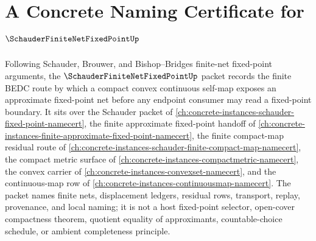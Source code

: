 \chapter{A Concrete Naming Certificate for $\SchauderFiniteNetFixedPointUp$}
\label{ch:concrete-instances-schauder-finite-net-fixed-point-namecert}

Following Schauder, Brouwer, and Bishop--Bridges finite-net fixed-point arguments, the $\SchauderFiniteNetFixedPointUp$ packet records the finite BEDC route by which a compact convex continuous self-map exposes an approximate fixed-point net before any endpoint consumer may read a fixed-point boundary. It sits over the Schauder packet of \autoref{ch:concrete-instances-schauder-fixed-point-namecert}, the finite approximate fixed-point handoff of \autoref{ch:concrete-instances-finite-approximate-fixed-point-namecert}, the finite compact-map residual route of \autoref{ch:concrete-instances-schauder-finite-compact-map-namecert}, the compact metric surface of \autoref{ch:concrete-instances-compactmetric-namecert}, the convex carrier of \autoref{ch:concrete-instances-convexset-namecert}, and the continuous-map row of \autoref{ch:concrete-instances-continuousmap-namecert}. The packet names finite nets, displacement ledgers, residual rows, transport, replay, provenance, and local naming; it is not a host fixed-point selector, open-cover compactness theorem, quotient equality of approximants, countable-choice schedule, or ambient completeness principle.

